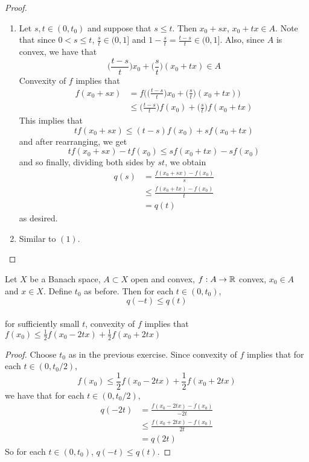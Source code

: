\documentclass{book}
\begin{document}
	\begin{proof}\
	\begin{enumerate}
	\item Let $s, t \in (0, t_0)$ and suppose that $s \leq t$. Then $x_0 +sx$, $x_0 + tx \in A$. Note that since $0 < s \leq t$, $\frac{s}{t} \in (0, 1]$ and $1- \frac{s}{t} = \frac{t-s}{t} \in (0, 1]$. Also, since $A$ is convex, we have that $$ \bigg( \frac{t-s}{t} \bigg) x_0 +  \bigg(\frac{s}{t} \bigg) (x_0 + tx)  \in A$$
	Convexity of $f$ implies that 
	\begin{align*}
	f(x_0 + sx)
	&= f\bigg ( \bigg( \frac{t-s}{t} \bigg) x_0 +  \bigg(\frac{s}{t} \bigg) (x_0 + tx) \bigg) \\
	& \leq \bigg( \frac{t-s}{t} \bigg) f(x_0) + \bigg(\frac{s}{t} \bigg) f(x_0 + tx)
	\end{align*}
	This implies that $$tf(x_0 + sx) \leq (t-s) f(x_0) + s f(x_0 + tx)$$
	and after rearranging, we get $$t f(x_0 + sx) - tf(x_0) \leq s f(x_0 + tx) - sf(x_0)$$
	and so finally, dividing both sides by $st$, we obtain 
	\begin{align*}
	q(s)
	&= \frac{f(x_0 + sx) - f(x_0)}{s} \\
	& \leq \frac{f(x_0 + tx) - f(x_0)}{t} \\
	&= q(t) 
	\end{align*}
	as desired.
	\item Similar to $(1)$.
	\end{enumerate}
	\end{proof}
	
	\begin{ex} \lex{}
	Let $X$ be a Banach space, $A \subset X$ open and convex, $f:A \rightarrow \mathbb{R}$ convex, $x_0 \in A$ and $x \in X$. Define $t_0$ as before. Then for each $t \in (0, t_0)$, $$q(-t) \leq q(t)$$ \\
	\tbf{Hint:} for sufficiently small $t$, convexity of $f$ implies that $f(x_0) \leq \frac{1}{2} f(x_0 - 2tx) + \frac{1}{2} f(x_0 + 2tx)$
	\end{ex}
	
	\begin{proof}
	Choose $t_0$ as in the previous exercise. Since convexity of $f$ implies that for each $t \in (0, t_0/2)$,
	$$f(x_0) \leq \frac{1}{2} f(x_0 - 2tx) + \frac{1}{2} f(x_0 + 2tx)$$
	we have that for each $t \in (0, t_0/2)$,
	\begin{align*}
	q(-2t) 
	&= \frac{f(x_0 - 2tx) - f(x_0)}{-2t} \\
	&\leq \frac{f(x_0 + 2tx) - f(x_0)}{2t} \\
	&= q(2t)
	\end{align*}	 
	So for each $t \in (0, t_0)$, $q(-t) \leq q(t)$.
	\end{proof}	
	
\end{document}
